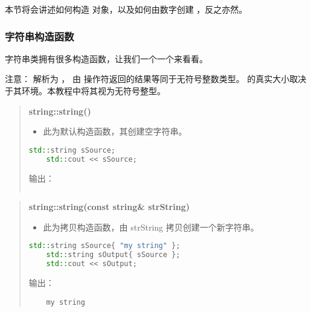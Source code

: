 \documentclass[../../LearnCpp.tex]{subfiles}
\begin{document}

本节将会讲述如何构造  对象，以及如何由数字创建 ，反之亦然。

\subsubsection*{字符串构造函数}

字符串类拥有很多构造函数，让我们一个一个来看看。

注意：  解析为 ，
由  操作符返回的结果等同于无符号整数类型。
 的真实大小取决于其环境。本教程中将其视为无符号整型。

\begin{quotation}
  \textbf{string::string()}

  \begin{itemize}
    \item 此为默认构造函数，其创建空字符串。
  \end{itemize}

  \begin{lstlisting}[language=C++]
    std::string sSource;
    std::cout << sSource;
    \end{lstlisting}

  输出：

  \begin{lstlisting}

    \end{lstlisting}
\end{quotation}

\begin{quotation}
  \textbf{string::string(const string\& strString)}

  \begin{itemize}
    \item 此为拷贝构造函数，由 strString 拷贝创建一个新字符串。
  \end{itemize}

  \begin{lstlisting}[language=C++]
    std::string sSource{ "my string" };
    std::string sOutput{ sSource };
    std::cout << sOutput;
    \end{lstlisting}

  输出：

  \begin{lstlisting}
    my string
    \end{lstlisting}
\end{quotation}
\end{document}
